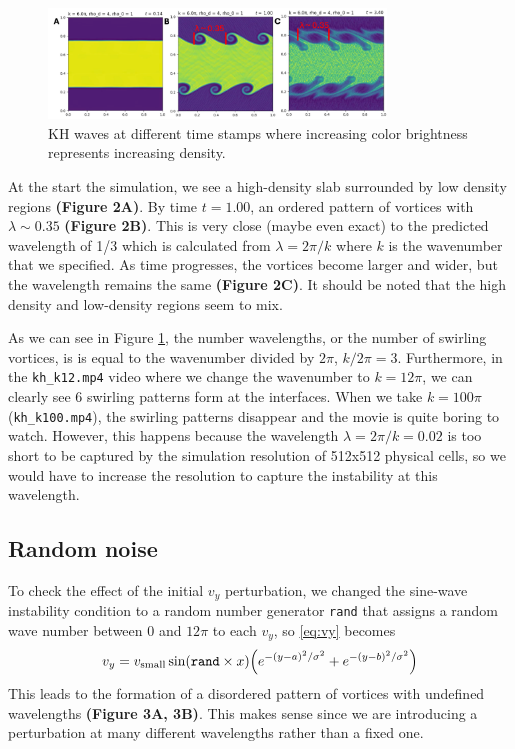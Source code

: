 \documentclass{article}
\begin{document}

\begin{figure}[htbp]
    \centering
    \includegraphics[width=0.8\textwidth]{images/kh3.png}
    \captionsetup{width=0.8\textwidth}
    \caption{KH waves at different time stamps where increasing
    color brightness represents increasing density.}
    \label{fig:kh3}
\end{figure}

At the start the simulation, we see a high-density slab surrounded by
low density regions \textbf{(Figure 2A)}. By time $t = 1.00$, an ordered
pattern of vortices with $\lambda \sim 0.35$ \textbf{(Figure 2B)}.
This is very close (maybe even exact) to the predicted wavelength of 1/3
which is calculated from $\lambda = 2\pi / k$ where $k$ is the wavenumber that we
specified. As time progresses, the vortices become larger and wider, but
the wavelength remains the same \textbf{(Figure 2C)}. It should be noted
that the high density and low-density regions seem to mix.

As we can see in Figure \ref{fig:kh3}, the number wavelengths, or the number of swirling vortices, is
is equal to the wavenumber divided by $2\pi$, $k / 2\pi = 3$. Furthermore,
in the \texttt{kh\_k12.mp4} video where we change the wavenumber to $k = 12\pi$,
we can clearly see 6 swirling patterns form at the interfaces. When we
take $k = 100 \pi$ (\texttt{kh\_k100.mp4}), the swirling patterns disappear and the movie is 
quite boring to watch. However, this happens because the wavelength $\lambda = 2\pi / k = 0.02$
is too short to be captured by the simulation resolution of 512x512 physical cells, so
we would have to increase the resolution to capture the instability at this wavelength.

\subsection*{Random noise}

To check the effect of the initial $v_y$ perturbation, we
changed the sine-wave instability condition to a random number generator \texttt{rand}
that assigns a random wave number between 0 and $12\pi$ to each
$v_y$, so \eqref{eq:vy} becomes
\begin{align*}
    v_y = v_{\text{small}} \sin(\text{\texttt{rand}} \times x) \qt(
        e^{-(y - a)^2 / \sigma^2} + e^{-(y - b)^2 / \sigma^2}
    )
\end{align*} 
This leads to the formation of a disordered pattern of vortices with
undefined wavelengths \textbf{(Figure 3A, 3B)}. This makes sense since
we are introducing a perturbation at many different wavelengths rather
than a fixed one.
\end{document}
